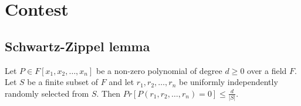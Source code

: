\chapter{Contest}


\section*{Schwartz-Zippel lemma}
Let $P \in F[x_1,x_2,\ldots,x_n]$ be a non-zero polynomial of degree $d \ge 0$ over a field $F$. Let $S$ be a finite subset of $F$ and let $r_1,r_2,\ldots,r_n$ be uniformly independently randomly selected from $S$. Then $Pr[P(r_1,r_2,\ldots,r_n)=0] \le \frac{d}{|S|}$.
